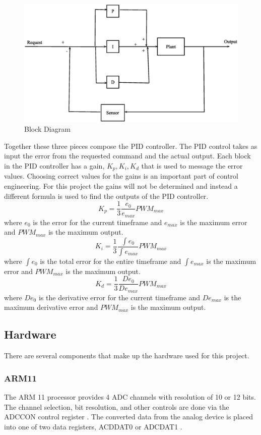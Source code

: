\documentclass[10pt,conference]{IEEEtran}
\begin{document}
\begin{figure}[ht]
	\includegraphics[scale=0.3]{PIDBlock}
	\caption{Block Diagram}\label{F:PIDBlock}
\end{figure}

Together these three pieces compose the PID controller. The PID control takes as input the error from the requested command and the actual output. Each block in the PID controller has a gain, $K_p, K_i, K_d$ that is used to message the error values. Choosing correct values for the gains is an important part of control engineering. For this project the gains will not be determined and instead a different formula is used to find the outputs of the PID controller.
\[
	K_p = \frac{1}{3}\frac{e_0}{e_{max}}PWM_{max}
\]
where $e_0$ is the error for the current timeframe and $e_{max}$ is the maximum error and $PWM_{max}$ is the maximum output.
\[
	K_i = \frac{1}{3}\frac{\int e_0}{\int e_{max}}PWM_{max}
\]
where $\int e_0$ is the total error for the entire timeframe and $\int e_{max}$ is the maximum error and $PWM_{max}$ is the maximum output.
\[
	K_d = \frac{1}{3}\frac{De_0}{De_{max}}PWM_{max}
\]
where $De_0$ is the derivative error for the current timeframe and $De_{max}$ is the maximum derivative error and $PWM_{max}$ is the maximum output.

\subsection{Hardware}
There are several components that make up the hardware used for this project.

\subsubsection{ARM11}\label{ARM11HW}
The ARM 11 processor provides 4 ADC channels with resolution of 10 or 12 bits. The channel selection, bit resolution, and other controls are done via the ADCCON control register \cite{Samsung}. The converted data from the analog device is placed into one of two data registers, ACDDAT0 or ADCDAT1 \cite{Samsung}.
\end{document}
